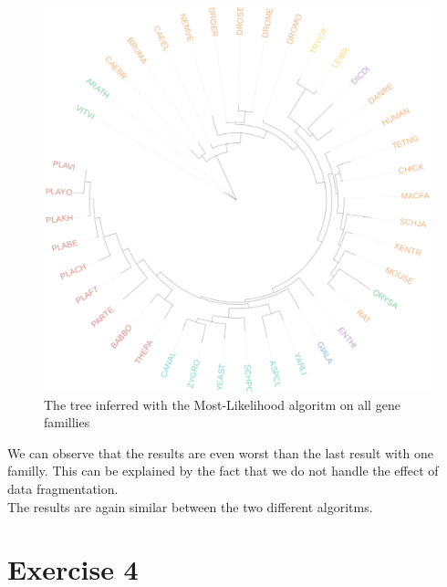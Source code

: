 \documentclass[]{article}
\theoremstyle{definition}
\begin{document}
\begin{figure}[H]
	\includegraphics*[width = \linewidth]{image/Ml_ex3.pdf}
	\caption{ The tree inferred with the Most-Likelihood algoritm on all gene famillies}
\end{figure}

We can observe that the results are even worst than the last result with one familly. This can be explained by the fact that we do not handle the effect of data fragmentation.\\
The results are again similar between the two different algoritms.

\section{Exercise 4}
\end{document}
